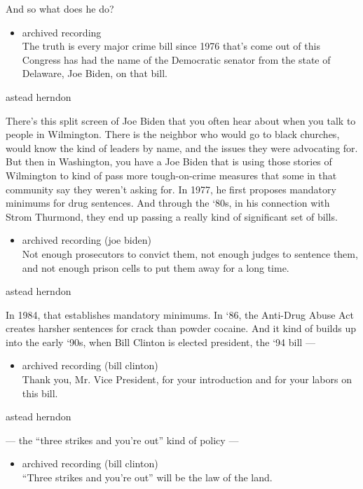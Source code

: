 And so what does he do?

\begin{itemize}
\tightlist
\item
  archived recording\\
  The truth is every major crime bill since 1976 that's come out of this
  Congress has had the name of the Democratic senator from the state of
  Delaware, Joe Biden, on that bill.
\end{itemize}

astead herndon

There's this split screen of Joe Biden that you often hear about when
you talk to people in Wilmington. There is the neighbor who would go to
black churches, would know the kind of leaders by name, and the issues
they were advocating for. But then in Washington, you have a Joe Biden
that is using those stories of Wilmington to kind of pass more
tough-on-crime measures that some in that community say they weren't
asking for. In 1977, he first proposes mandatory minimums for drug
sentences. And through the `80s, in his connection with Strom Thurmond,
they end up passing a really kind of significant set of bills.

\begin{itemize}
\tightlist
\item
  archived recording (joe biden)\\
  Not enough prosecutors to convict them, not enough judges to sentence
  them, and not enough prison cells to put them away for a long time.
\end{itemize}

astead herndon

In 1984, that establishes mandatory minimums. In `86, the Anti-Drug
Abuse Act creates harsher sentences for crack than powder cocaine. And
it kind of builds up into the early `90s, when Bill Clinton is elected
president, the `94 bill ---

\begin{itemize}
\tightlist
\item
  archived recording (bill clinton)\\
  Thank you, Mr. Vice President, for your introduction and for your
  labors on this bill.
\end{itemize}

astead herndon

--- the ``three strikes and you're out'' kind of policy ---

\begin{itemize}
\tightlist
\item
  archived recording (bill clinton)\\
  ``Three strikes and you're out'' will be the law of the land.
\end{itemize}

